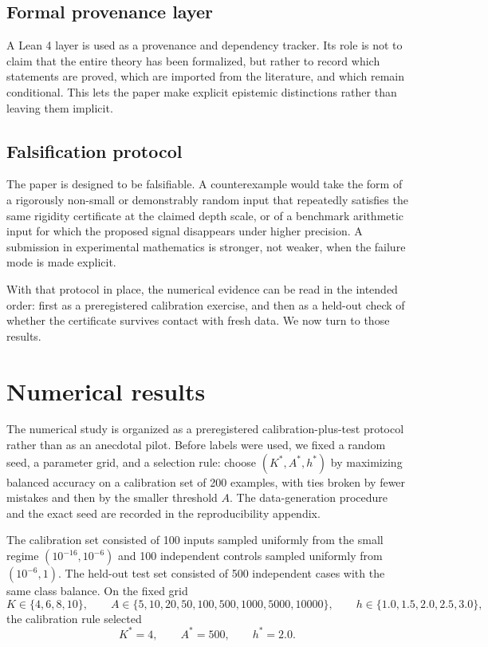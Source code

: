 \documentclass[11pt]{article}
\begin{document}
\subsection{Formal provenance layer}
A Lean 4 layer is used as a provenance and dependency tracker. Its role is not to claim that the entire theory has been formalized, but rather to record which statements are proved, which are imported from the literature, and which remain conditional. This lets the paper make explicit epistemic distinctions rather than leaving them implicit.

\subsection{Falsification protocol}
The paper is designed to be falsifiable. A counterexample would take the form of a rigorously non-small or demonstrably random input that repeatedly satisfies the same rigidity certificate at the claimed depth scale, or of a benchmark arithmetic input for which the proposed signal disappears under higher precision. A submission in experimental mathematics is stronger, not weaker, when the failure mode is made explicit.

With that protocol in place, the numerical evidence can be read in the intended order: first as a preregistered calibration exercise, and then as a held-out check of whether the certificate survives contact with fresh data. We now turn to those results.

\section{Numerical results}

The numerical study is organized as a preregistered calibration-plus-test protocol rather than as an anecdotal pilot. Before labels were used, we fixed a random seed, a parameter grid, and a selection rule: choose $(K^*,A^*,h^*)$ by maximizing balanced accuracy on a calibration set of 200 examples, with ties broken by fewer mistakes and then by the smaller threshold $A$. The data-generation procedure and the exact seed are recorded in the reproducibility appendix.

The calibration set consisted of 100 inputs sampled uniformly from the small regime $(10^{-16},10^{-6})$ and 100 independent controls sampled uniformly from $(10^{-6},1)$. The held-out test set consisted of 500 independent cases with the same class balance. On the fixed grid
\[
K\in\{4,6,8,10\}, \qquad A\in\{5,10,20,50,100,500,1000,5000,10000\}, \qquad h\in\{1.0,1.5,2.0,2.5,3.0\},
\]
the calibration rule selected
\[
K^*=4, \qquad A^*=500, \qquad h^*=2.0.
\]
\end{document}
